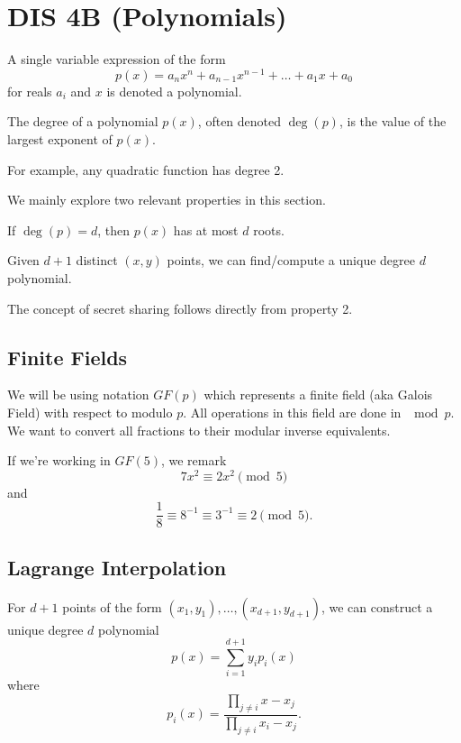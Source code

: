 \section{DIS 4B (Polynomials)}

A single variable expression of the form \[ p(x) = a_n x^n + a_{n-1} x^{n-1} + \ldots + a_1x + a_0 \] for reals $a_i$ and $x$ is denoted a polynomial. 
\begin{definition}[degree]
    The degree of a polynomial $p(x)$, often denoted $\deg(p)$, is the value of the largest exponent of $p(x)$. 
\end{definition}
For example, any quadratic function has degree 2. 

We mainly explore two relevant properties in this section.

\begin{note}[Proprety 1]
    If $\deg(p) = d$, then $p(x)$ has at most $d$ roots.
\end{note}
\begin{note}[Property 2]
    Given $d+1$ distinct $(x,y)$ points, we can find/compute a unique degree $d$ polynomial. 
\end{note}

The concept of secret sharing follows directly from property 2. 

\subsection{Finite Fields}
We will be using notation $GF(p)$ which represents a finite field (aka Galois Field) with respect to modulo $p$. All operations in this field are done in $\mod p$. We want to convert all fractions to their modular inverse equivalents. 

\begin{example}
    If we're working in $GF(5)$, we remark \[ 7x^2 \equiv 2x^2 \pmod{5} \] and \[ \frac{1}{8} \equiv 8^{-1} \equiv 3^{-1} \equiv 2 \pmod{5}. \]
\end{example}

\subsection{Lagrange Interpolation}
For $d+1$ points of the form $(x_1, y_1), \ldots, (x_{d+1}, y_{d+1})$, we can construct a unique degree $d$ polynomial \[ p(x) = \sum_{i=1}^{d+1} y_i p_{i}(x) \] where \[ p_{i}(x) = \frac{\prod_{j \neq i} x - x_j}{\prod_{j \neq i} x_i - x_j}. \]